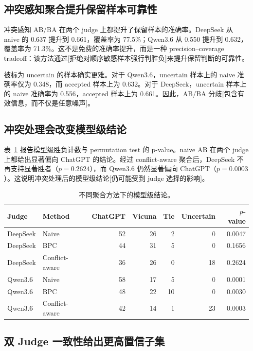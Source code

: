 \documentclass[11pt]{ctexart}
\begin{document}
\subsection{冲突感知聚合提升保留样本可靠性}

冲突感知 AB/BA 在两个 judge 上都提升了保留样本的准确率。DeepSeek 从 naive 的 0.637 提升到 0.661，覆盖率为 77.5\%；Qwen3.6 从 0.550 提升到 0.632，覆盖率为 71.3\%。这不是免费的准确率提升，而是一种 precision--coverage tradeoff：该方法通过[拒绝对顺序敏感样本强行判胜负]来提升保留判断的可靠性。

被标为 uncertain 的样本确实更难。对于 Qwen3.6，uncertain 样本上的 naive 准确率仅为 0.348，而 accepted 样本上为 0.632。对于 DeepSeek，uncertain 样本上的 naive 准确率为 0.556，accepted 样本上为 0.661。因此，AB/BA 分歧[包含有效信息，而不仅是任意噪声]。

\subsection{冲突处理会改变模型级结论}

表~\ref{tab:modellevel-zh} 报告模型级胜负计数与 permutation test 的 p-value。naive AB 在两个 judge 上都给出显著偏向 ChatGPT 的结论。经过 conflict-aware 聚合后，DeepSeek 不再支持显著胜者（$p=0.2624$），而 Qwen3.6 仍然显著偏向 ChatGPT（$p=0.0003$）。这说明冲突处理后的模型级结论[仍可能受到 judge 选择的影响]。

\begin{table}[h]
\centering
\begin{tabular}{llrrrrr}
\toprule
Judge & Method & ChatGPT & Vicuna & Tie & Uncertain & $p$-value \\
\midrule
DeepSeek & Naive & 52 & 26 & 2 & 0 & 0.0047 \\
DeepSeek & BPC & 44 & 31 & 5 & 0 & 0.1656 \\
DeepSeek & Conflict-aware & 36 & 26 & 0 & 18 & 0.2624 \\
\midrule
Qwen3.6 & Naive & 58 & 17 & 5 & 0 & 0.0001 \\
Qwen3.6 & BPC & 48 & 22 & 10 & 0 & 0.0030 \\
Qwen3.6 & Conflict-aware & 42 & 14 & 1 & 23 & 0.0003 \\
\bottomrule
\end{tabular}
\caption{不同聚合方法下的模型级结论。}
\label{tab:modellevel-zh}
\end{table}

\subsection{双 Judge 一致性给出更高置信子集}
\end{document}
